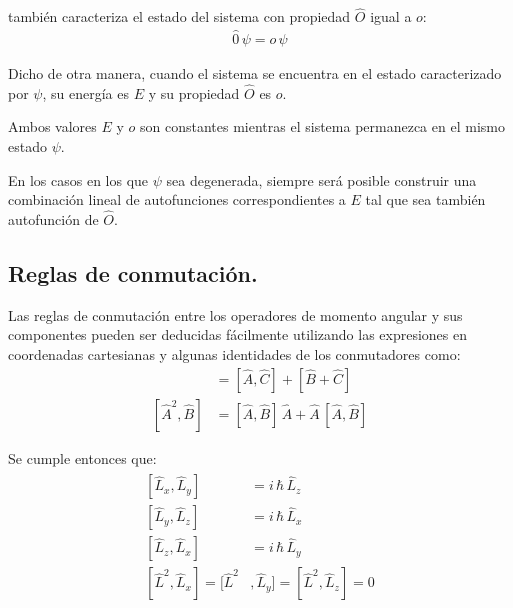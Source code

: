 también caracteriza el estado del sistema con propiedad $\hat{O}$ igual a $o$:
\begin{align*}
\hat{0} \, \psi = o \, \psi
\end{align*}

Dicho de otra manera, cuando el sistema se encuentra en el estado caracterizado por $\psi$, su energía es $E$ y su propiedad $\hat{O}$ es $o$.
\par
Ambos valores $E$ y $o$ son constantes mientras el sistema permanezca en el mismo estado $\psi$.
\par
En los casos en los que $\psi$ sea degenerada, siempre será posible construir una combinación lineal de autofunciones correspondientes a $E$ tal que sea también autofunción de $\hat{O}$.

\subsection{Reglas de conmutación.}

Las reglas de conmutación entre los operadores de momento angular y sus componentes pueden ser deducidas fácilmente utilizando las expresiones en coordenadas cartesianas y algunas identidades de los conmutadores como:
\begin{align*}
[ \hat{A} + \hat{B}, \hat{C}] &= [\hat{A}, \hat{C}] + [\hat{B} + \hat{C}] \\[0.5em]
[ \hat{A}^{2} , \hat{B}] &= [\hat{A}, \hat{B}] \, \hat{A} +  \hat{A} \, [\hat{A} , \hat{B}]
\end{align*}

Se cumple entonces que:
\begin{align}
\begin{aligned}
[ \hat{L}_{x}, \hat{L}_{y} ] &= i \, \hbar \, \hat{L}_{z} \\[0.5em]
[ \hat{L}_{y}, \hat{L}_{z} ] &= i \, \hbar \, \hat{L}_{x} \\[0.5em]
[ \hat{L}_{z}, \hat{L}_{x} ] &= i \, \hbar \, \hat{L}_{y} \\[0.5em]
[\hat{L}^{2}, \hat{L}_{x}] = [\hat{L}^{2}&, \hat{L}_{y}] = [\hat{L}^{2}, \hat{L}_{z}] = 0
\end{aligned}
\label{eq:ecuacion_01_07}
\end{align}

